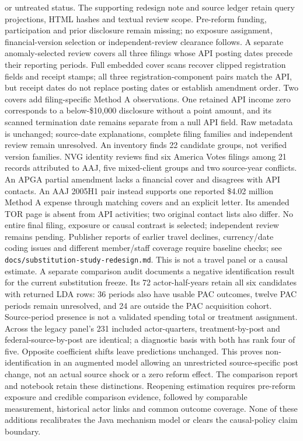 or untreated status. The supporting redesign note and source ledger retain
query projections, HTML hashes and textual review scope. Pre-reform funding,
participation and prior disclosure remain missing; no exposure assignment,
financial-version selection or independent-review clearance follows.
A separate anomaly-selected review covers all three filings whose API posting
dates precede their reporting periods. Full embedded cover scans recover clipped
registration fields and receipt stamps; all three registration-component pairs
match the API, but receipt dates do not replace posting dates or establish
amendment order. Two covers add filing-specific Method A observations. One
retained API income zero corresponds to a below-\$10,000 disclosure without a
point amount, and its scanned termination date remains separate from a null API
field. Raw metadata is unchanged; source-date explanations, complete filing
families and independent review remain unresolved.
An inventory finds 22 candidate groups, not verified version families. NVG
identity reviews find six America Votes filings among 21 records attributed to
AAJ, five mixed-client groups and two source-year conflicts. An APGA partial
amendment lacks a financial cover and disagrees with API contacts. An AAJ 2005H1
pair instead supports one reported \$4.02 million Method A expense through
matching covers and an explicit letter. Its amended TOR page is absent from API
activities; two original contact lists also differ. No entire final filing,
exposure or causal contrast is selected; independent review remains pending.
Publisher reports of earlier travel declines, currency/date coding issues and
different member/staff coverage require baseline checks; see
\texttt{docs/substitution-study-redesign.md}.
This is not a travel panel or a causal estimate.
A separate comparison audit documents a negative identification result for the
current substitution freeze. Its 72 actor-half-years retain all six candidates
with returned LDA rows: 36 periods also have usable PAC outcomes, twelve PAC
periods remain unresolved, and 24 are outside the PAC acquisition cohort.
Source-period presence is not a validated spending total or treatment assignment.
Across the legacy panel's 231 included actor-quarters, treatment-by-post and
federal-source-by-post are identical; a diagnostic basis with both has rank four
of five. Opposite coefficient shifts leave predictions unchanged. This proves
non-identification in an augmented model allowing an unrestricted source-specific
post change, not an actual source shock or a zero reform effect. The comparison
report and notebook retain these distinctions. Reopening estimation requires
pre-reform exposure and credible comparison evidence, followed by comparable
measurement, historical actor links and common outcome coverage.
None of these additions recalibrates the
Java mechanism model or clears the causal-policy claim boundary.

